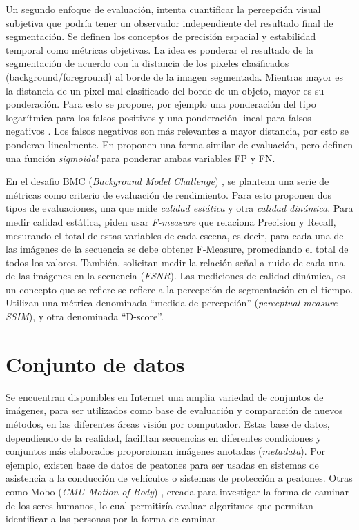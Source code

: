 \indent Un segundo enfoque de evaluación, intenta cuantificar la percepción visual subjetiva que podría tener un observador independiente del resultado final de segmentación. Se definen los conceptos de precisión espacial y estabilidad temporal \cite{cavallaro_objective_2002} \cite{villegas_perceptually-weighted_2004} como métricas objetivas. La idea es ponderar el resultado de la segmentación de acuerdo con la distancia de los pixeles clasificados (background/foreground) al borde de la imagen segmentada. Mientras mayor es la distancia de un pixel mal clasificado del borde de un objeto, mayor es su ponderación. Para esto se propone, por ejemplo una ponderación del tipo logarítmica para los falsos positivos y una ponderación lineal para falsos negativos \cite{cavallaro_objective_2002} \cite{villegas_perceptually-weighted_2004}. Los falsos negativos son más relevantes a mayor distancia, por esto se ponderan linealmente. En \cite{liu_metrics_2011} proponen una forma similar de evaluación, pero definen una función \emph{sigmoidal} para ponderar ambas variables FP y FN.

\indent En el desafio BMC (\textit{Background Model Challenge}) \cite{park_benchmark_2013}, se plantean una serie de métricas como criterio de evaluación de rendimiento. Para esto  proponen dos tipos de evaluaciones, una que mide \emph{calidad estática} y otra \emph{calidad dinámica}. Para medir calidad estática, piden usar \emph{F-measure} que relaciona Precision y Recall, mesurando el total de estas variables de cada escena, es decir, para cada una de las imágenes de la secuencia se debe obtener F-Measure, promediando el total de todos los valores. También, solicitan medir la relación señal a ruido de cada una de las imágenes en la secuencia (\textit{FSNR}). Las mediciones de calidad dinámica, es un concepto que se refiere se refiere a la percepción de segmentación en el tiempo. Utilizan una métrica denominada ``medida de percepción'' (\textit{perceptual measure-SSIM}), y otra denominada ``D-score''\cite{lallier_testing_2011}.


\section{Conjunto de datos}

\indent Se encuentran disponibles en Internet una amplia variedad de conjuntos de imágenes, para ser utilizados como base de evaluación y comparación de nuevos métodos, en las diferentes áreas visión por computador. Estas base de datos, dependiendo de la realidad, facilitan secuencias en diferentes condiciones y conjuntos más elaborados proporcionan imágenes anotadas (\textit{metadata}). Por ejemplo, existen base de datos de peatones \cite{piotr_pedestrian_2012, ess_depth_2007} para ser usadas en sistemas de asistencia a la conducción de vehículos o sistemas de protección a peatones. Otras como Mobo (\textit{CMU Motion of Body}) \cite{gross_cmu_2001}, creada para investigar la forma de caminar de los seres humanos, lo cual permitiría evaluar algoritmos que permitan identificar a las personas por la forma de caminar.

